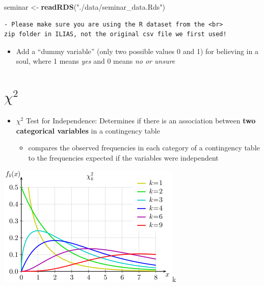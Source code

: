 \documentclass[
]{book}
\newenvironment{Shaded}{\begin{snugshade}}{\end{snugshade}}
\newcommand{\DecValTok}[1]{\textcolor[rgb]{0.00,0.00,0.81}{#1}}
\newcommand{\FunctionTok}[1]{\textcolor[rgb]{0.13,0.29,0.53}{\textbf{#1}}}
\newcommand{\NormalTok}[1]{#1}
\newcommand{\OtherTok}[1]{\textcolor[rgb]{0.56,0.35,0.01}{#1}}
\newcommand{\SpecialCharTok}[1]{\textcolor[rgb]{0.81,0.36,0.00}{\textbf{#1}}}
\newcommand{\StringTok}[1]{\textcolor[rgb]{0.31,0.60,0.02}{#1}}
\providecommand{\tightlist}{%
  \setlength{\itemsep}{0pt}\setlength{\parskip}{0pt}}
\begin{document}
\begin{Shaded}
\begin{Highlighting}[]
\NormalTok{seminar }\OtherTok{\textless{}{-}} \FunctionTok{readRDS}\NormalTok{(}\StringTok{"./data/seminar\_data.Rds"}\NormalTok{)}
\end{Highlighting}
\end{Shaded}

\begin{verbatim}
- Please make sure you are using the R dataset from the <br>
zip folder in ILIAS, not the original csv file we first used!
\end{verbatim}

\begin{itemize}
\tightlist
\item
  Add a ``dummy variable'' (only two possible values 0 and 1)
  for believing in a soul, where 1 means \emph{yes} and 0 means \emph{no or unsure}
\end{itemize}

\begin{Shaded}
\end{Shaded}

\section{\texorpdfstring{\(\chi^2\)}{\textbackslash chi\^{}2}}\label{chi2}

\begin{itemize}
\tightlist
\item
  \(\chi^2\) Test for Independence: Determines if there is an association between \textbf{two categorical variables} in a contingency table

  \begin{itemize}
  \tightlist
  \item
    compares the observed frequencies in each category of a contingency table to the frequencies expected if the variables were independent
  \end{itemize}
\end{itemize}

\includegraphics{./img/chidist.png}k
\end{document}
